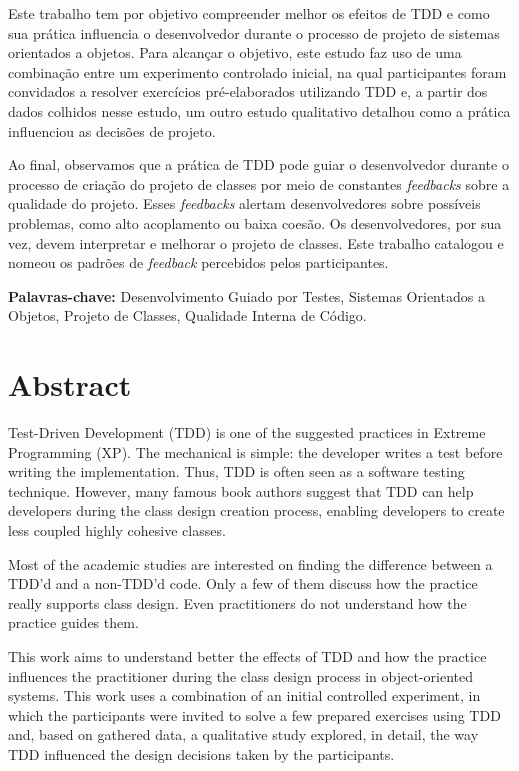 \documentclass[11pt,openany,twoside,a4paper]{book}
\begin{document}
Este trabalho tem por objetivo compreender melhor os efeitos de TDD e como sua prática 
influencia o desenvolvedor durante o processo de projeto de sistemas orientados a objetos.
Para alcançar o objetivo, este estudo faz uso de uma combinação entre um experimento controlado 
inicial, na qual participantes foram
convidados a resolver exercícios pré-elaborados utilizando TDD e, a partir dos dados colhidos nesse estudo, um outro
estudo qualitativo detalhou como a prática influenciou as decisões de projeto.

Ao final, observamos que a prática de TDD pode guiar o desenvolvedor durante o processo
de criação do projeto de classes por meio de constantes \textit{feedbacks} sobre a qualidade
do projeto. Esses \textit{feedbacks} alertam desenvolvedores sobre possíveis problemas,
como alto acoplamento ou baixa coesão. Os desenvolvedores, por sua vez, devem interpretar
e melhorar o projeto de classes. Este trabalho catalogou e nomeou os padrões de
\textit{feedback} percebidos pelos participantes.

\noindent \textbf{Palavras-chave:} Desenvolvimento Guiado por Testes, Sistemas Orientados
a Objetos, Projeto de Classes, Qualidade Interna de Código.

\chapter*{Abstract}

Test-Driven Development (TDD) is one of the suggested practices in Extreme
Programming (XP). The mechanical is simple: the developer writes a test before
writing the implementation. Thus, TDD is often seen as
a software testing technique. However, many famous book authors suggest that
TDD can help developers during the class design creation
process, enabling developers to create less coupled highly cohesive classes.

Most of the academic studies are interested on finding the difference between
a TDD'd and a non-TDD'd code. Only a few of them discuss how the practice
really supports class design. Even practitioners
do not understand how the practice guides them.

This work aims to understand better the effects of TDD and how the practice influences the
practitioner during the class design process in object-oriented systems. 
This work uses a combination of an initial controlled experiment, in which the participants
were invited to solve a few prepared exercises using TDD and, based on gathered data,
a qualitative study explored, in detail, the way TDD influenced the design decisions
taken by the participants.
\end{document}
